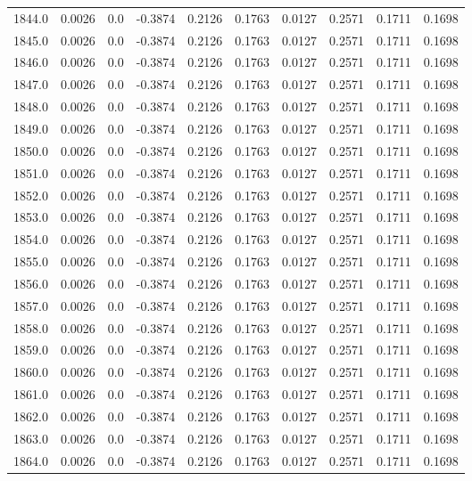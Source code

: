 \begin{longtable}{lrrrrrrrrr}
1844.0 & 0.0026 & 0.0 & -0.3874 & 0.2126 & 0.1763 & 0.0127 & 0.2571 & 0.1711 & 0.1698 \\
1845.0 & 0.0026 & 0.0 & -0.3874 & 0.2126 & 0.1763 & 0.0127 & 0.2571 & 0.1711 & 0.1698 \\
1846.0 & 0.0026 & 0.0 & -0.3874 & 0.2126 & 0.1763 & 0.0127 & 0.2571 & 0.1711 & 0.1698 \\
1847.0 & 0.0026 & 0.0 & -0.3874 & 0.2126 & 0.1763 & 0.0127 & 0.2571 & 0.1711 & 0.1698 \\
1848.0 & 0.0026 & 0.0 & -0.3874 & 0.2126 & 0.1763 & 0.0127 & 0.2571 & 0.1711 & 0.1698 \\
1849.0 & 0.0026 & 0.0 & -0.3874 & 0.2126 & 0.1763 & 0.0127 & 0.2571 & 0.1711 & 0.1698 \\
1850.0 & 0.0026 & 0.0 & -0.3874 & 0.2126 & 0.1763 & 0.0127 & 0.2571 & 0.1711 & 0.1698 \\
1851.0 & 0.0026 & 0.0 & -0.3874 & 0.2126 & 0.1763 & 0.0127 & 0.2571 & 0.1711 & 0.1698 \\
1852.0 & 0.0026 & 0.0 & -0.3874 & 0.2126 & 0.1763 & 0.0127 & 0.2571 & 0.1711 & 0.1698 \\
1853.0 & 0.0026 & 0.0 & -0.3874 & 0.2126 & 0.1763 & 0.0127 & 0.2571 & 0.1711 & 0.1698 \\
1854.0 & 0.0026 & 0.0 & -0.3874 & 0.2126 & 0.1763 & 0.0127 & 0.2571 & 0.1711 & 0.1698 \\
1855.0 & 0.0026 & 0.0 & -0.3874 & 0.2126 & 0.1763 & 0.0127 & 0.2571 & 0.1711 & 0.1698 \\
1856.0 & 0.0026 & 0.0 & -0.3874 & 0.2126 & 0.1763 & 0.0127 & 0.2571 & 0.1711 & 0.1698 \\
1857.0 & 0.0026 & 0.0 & -0.3874 & 0.2126 & 0.1763 & 0.0127 & 0.2571 & 0.1711 & 0.1698 \\
1858.0 & 0.0026 & 0.0 & -0.3874 & 0.2126 & 0.1763 & 0.0127 & 0.2571 & 0.1711 & 0.1698 \\
1859.0 & 0.0026 & 0.0 & -0.3874 & 0.2126 & 0.1763 & 0.0127 & 0.2571 & 0.1711 & 0.1698 \\
1860.0 & 0.0026 & 0.0 & -0.3874 & 0.2126 & 0.1763 & 0.0127 & 0.2571 & 0.1711 & 0.1698 \\
1861.0 & 0.0026 & 0.0 & -0.3874 & 0.2126 & 0.1763 & 0.0127 & 0.2571 & 0.1711 & 0.1698 \\
1862.0 & 0.0026 & 0.0 & -0.3874 & 0.2126 & 0.1763 & 0.0127 & 0.2571 & 0.1711 & 0.1698 \\
1863.0 & 0.0026 & 0.0 & -0.3874 & 0.2126 & 0.1763 & 0.0127 & 0.2571 & 0.1711 & 0.1698 \\
1864.0 & 0.0026 & 0.0 & -0.3874 & 0.2126 & 0.1763 & 0.0127 & 0.2571 & 0.1711 & 0.1698 \\

\end{longtable}
